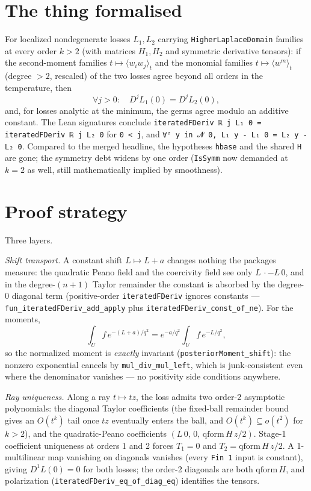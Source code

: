 \documentclass[11pt]{article}
\begin{document}
\section{The thing formalised}

For localized nondegenerate losses $L_1, L_2$ carrying
\texttt{HigherLaplaceDomain} families at every order $k > 2$ (with
matrices $H_1, H_2$ and symmetric derivative tensors): if the
second-moment families $t \mapsto \langle w_i w_j\rangle_t$ and the
monomial families $t \mapsto \langle w^{m}\rangle_t$ (degree $> 2$,
rescaled) of the two losses agree beyond all orders in the temperature,
then
\[
\forall j > 0:\quad D^j L_1(0) = D^j L_2(0),
\]
and, for losses analytic at the minimum, the germs agree modulo an
additive constant. The Lean signatures conclude
\texttt{iteratedFDeriv ℝ j L₁ 0 = iteratedFDeriv ℝ j L₂ 0} for
\texttt{0 < j}, and
\texttt{∀ᶠ y in 𝓝 0, L₁ y - L₁ 0 = L₂ y - L₂ 0}. Compared to the merged
headline, the hypotheses \texttt{hbase} and the shared \texttt{H} are
gone; the symmetry debt widens by one order (\texttt{IsSymm} now demanded
at $k = 2$ as well, still mathematically implied by smoothness).

\section{Proof strategy}

Three layers.

\emph{Shift transport.} A constant shift $L \mapsto L + a$ changes
nothing the packages measure: the quadratic Peano field and the coercivity
field see only $L\,\cdot - L\,0$, and in the degree-$(n{+}1)$ Taylor
remainder the constant is absorbed by the degree-0 diagonal term
(positive-order \texttt{iteratedFDeriv} ignores constants ---
\texttt{fun\_iteratedFDeriv\_add\_apply} plus
\texttt{iteratedFDeriv\_const\_of\_ne}). For the moments,
\[
\int_U f\, e^{-(L + a)/q^2}
= e^{-a/q^2} \int_U f\, e^{-L/q^2},
\]
so the normalized moment is \emph{exactly} invariant
(\texttt{posteriorMoment\_shift}): the nonzero exponential cancels by
\texttt{mul\_div\_mul\_left}, which is junk-consistent even where the
denominator vanishes --- no positivity side conditions anywhere.

\emph{Ray uniqueness.} Along a ray $t \mapsto tz$, the loss admits two
order-2 asymptotic polynomials: the diagonal Taylor coefficients (the
fixed-ball remainder bound gives an $O(t^k)$ tail once $tz$ eventually
enters the ball, and $O(t^k) \subseteq o(t^2)$ for $k > 2$), and the
quadratic-Peano coefficients $(L\,0,\, 0,\, \mathrm{qform}\,H\,z/2)$.
Stage-1 coefficient uniqueness at orders 1 and 2 forces $T_1 = 0$ and
$T_2 = \mathrm{qform}\,H\,z/2$. A 1-multilinear map vanishing on
diagonals vanishes (every \texttt{Fin 1} input is constant), giving
$D^1L(0) = 0$ for both losses; the order-2 diagonals are both
$\mathrm{qform}\,H$, and polarization
(\texttt{iteratedFDeriv\_eq\_of\_diag\_eq}) identifies the tensors.
\end{document}
